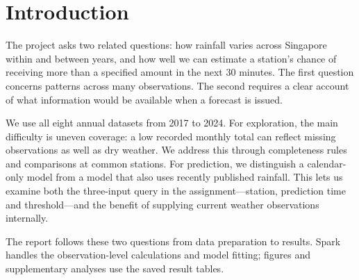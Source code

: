 \begin{abstract}
Singapore's five-minute rainfall records offer a detailed view of local weather, but gaps in the record complicate comparisons over time. We analyse the 2017--2024 annual datasets with Apache Spark, retaining 48.54 million observations from 91 station IDs after cleaning. Among sufficiently complete station-months, November has the highest mean monthly rainfall and wet intervals are most frequent in the afternoon. Comparisons between years depend strongly on which stations and months have adequate coverage. For the prediction task, we estimate the probability of exceeding a requested rainfall amount in the next 30 minutes. We compare a random forest using recent station rainfall with one using station and calendar information alone, alongside logistic-regression and historical-frequency baselines. On 5.73 million shared test cases from 2024, the recent-rainfall forest achieves a mean Brier score of 0.01613, compared with 0.02283 for the calendar forest. The calendar forest does not improve on historical frequency overall. Recent observations therefore provide useful predictive information in this experiment, while calendar-only estimates are better understood as historical risk. Large rainfall accumulations, missing observations and changes beyond the study period remain important limits.
\end{abstract}

\section{Introduction}
The project asks two related questions: how rainfall varies across Singapore within and between years, and how well we can estimate a station's chance of receiving more than a specified amount in the next 30 minutes. The first question concerns patterns across many observations. The second requires a clear account of what information would be available when a forecast is issued.

We use all eight annual datasets from 2017 to 2024. For exploration, the main difficulty is uneven coverage: a low recorded monthly total can reflect missing observations as well as dry weather. We address this through completeness rules and comparisons at common stations. For prediction, we distinguish a calendar-only model from a model that also uses recently published rainfall. This lets us examine both the three-input query in the assignment---station, prediction time and threshold---and the benefit of supplying current weather observations internally.

The report follows these two questions from data preparation to results. Spark handles the observation-level calculations and model fitting; figures and supplementary analyses use the saved result tables.
